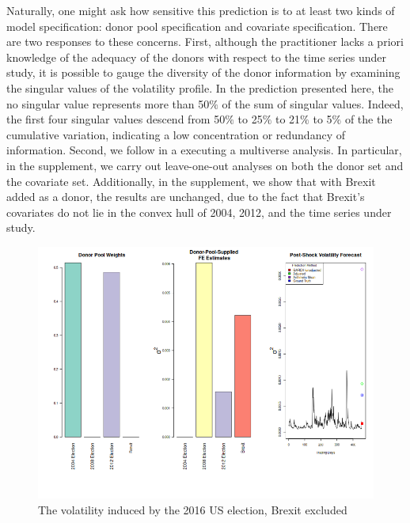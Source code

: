 \documentclass[11pt]{article}
\theoremstyle{definition}
\begin{document}
Naturally, one might ask how sensitive this prediction is to at least two kinds of model specification: donor pool specification and covariate specification.  There are two responses to these concerns.  First, although the practitioner lacks a priori knowledge of the adequacy of the donors with respect to the time series under study, it is possible to gauge the diversity of the donor information by examining the singular values of the volatility profile.  In the prediction presented here, the no singular value represents more than 50$\%$ of the sum of singular values.  Indeed, the first four singular values descend from 50$\%$ to 25$\%$ to 21$\%$ to 5$\%$ of the the cumulative variation, indicating a low concentration or redundancy of information.  Second, we follow \citet{steegen2016increasing} in a executing a multiverse analysis.  In particular, in the supplement, we carry out leave-one-out analyses on both the donor set and the covariate set.  Additionally, in the supplement, we show that with Brexit added as a donor, the results are unchanged, due to the fact that Brexit's covariates do not lie in the convex hull of 2004, 2012, and the time series under study.

\begin{figure}[h!]
\begin{center}
  \includegraphics[scale=.6]{real_data_output_plots/savetime_WedJan1010:53:23PM2024_IYG_CL=F-^VIX-^IRX-^FVX-^TNX-^TYX_^VIX_2016-11-08-2004-11-02-2008-11-04-2012-11-06-2016-06-23.png}
  \caption{The volatility induced by the 2016 US election, Brexit excluded}
  \label{fig:SVF_2016_without_Brexit}
  \end{center}
\end{figure}
\end{document}
